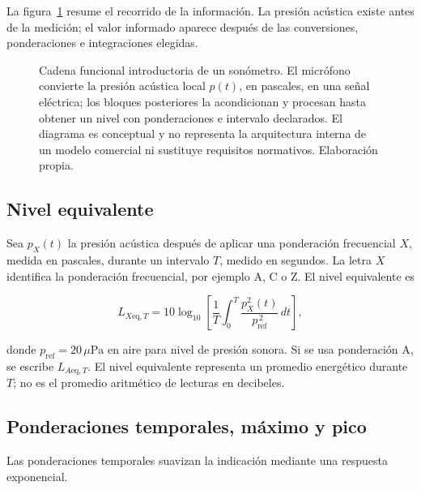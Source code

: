 La figura~\ref{fig:u5-cadena-sonometro} resume el recorrido de la información.
La presión acústica existe antes de la medición; el valor informado aparece
después de las conversiones, ponderaciones e integraciones elegidas.

\begin{figure}[htbp]
    \centering
    
    \caption{Cadena funcional introductoria de un sonómetro. El micrófono
    convierte la presión acústica local \(p(t)\), en pascales, en una señal
    eléctrica; los bloques posteriores la acondicionan y procesan hasta obtener
    un nivel con ponderaciones e intervalo declarados. El diagrama es
    conceptual y no representa la arquitectura interna de un modelo comercial
    ni sustituye requisitos normativos. Elaboración propia.}
    \label{fig:u5-cadena-sonometro}
\end{figure}

\subsection{Nivel equivalente}
\label{sec:u5-leq}

Sea \(p_X(t)\) la presión acústica después de aplicar una ponderación
frecuencial \(X\), medida en pascales, durante un intervalo \(T\), medido en
segundos. La letra \(X\) identifica la ponderación frecuencial, por ejemplo A,
C o Z. El nivel equivalente es

\begin{equation}
    L_{X\mathrm{eq},T}
    =10\log_{10}
    \left[
        \frac{1}{T}
        \int_0^T
        \frac{p_X^2(t)}{p_\mathrm{ref}^{\,2}}\,dt
    \right],
    \label{eq:u5-leq}
\end{equation}

donde \(p_\mathrm{ref}=20\,\mu\text{Pa}\) en aire para nivel de presión
sonora. Si se usa ponderación A, se escribe \(L_{A\mathrm{eq},T}\). El nivel
equivalente representa un promedio energético durante \(T\); no es el promedio
aritmético de lecturas en decibeles.

\subsection{Ponderaciones temporales, máximo y pico}
\label{sec:u5-ponderaciones-temporales}

Las ponderaciones temporales suavizan la indicación mediante una respuesta
exponencial. 

